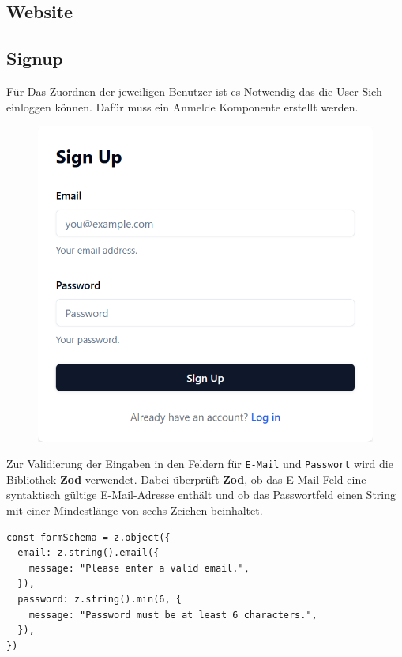 \begin{inhalt}
\renewcommand*\chapterpagestyle{scrheadings}
\chapter{Website}


\section{Signup}

Für Das Zuordnen der jeweiligen Benutzer ist es Notwendig das die User Sich einloggen können. Dafür muss ein Anmelde Komponente erstellt werden.

\begin{figure}[!htb]
\centering
\includegraphics[width=1\textwidth]{files/Thomas/pics/Website/Signup/sign-up.png}
\caption[Bildbezeichnung für Abbildungsverzeichnis]{}
\label{fig:gehaeuse_internet_bild}
\end{figure}

Zur Validierung der Eingaben in den Feldern für \texttt{E-Mail} und \texttt{Passwort} wird die Bibliothek \textbf{Zod} verwendet. Dabei überprüft \textbf{Zod}, ob das E-Mail-Feld eine syntaktisch gültige E-Mail-Adresse enthält und ob das Passwortfeld einen String mit einer Mindestlänge von sechs Zeichen beinhaltet.


\begin{lstlisting}[style=mytsx]
const formSchema = z.object({
  email: z.string().email({
    message: "Please enter a valid email.",
  }),
  password: z.string().min(6, {
    message: "Password must be at least 6 characters.",
  }),
})
\end{lstlisting}


\end{inhalt}
